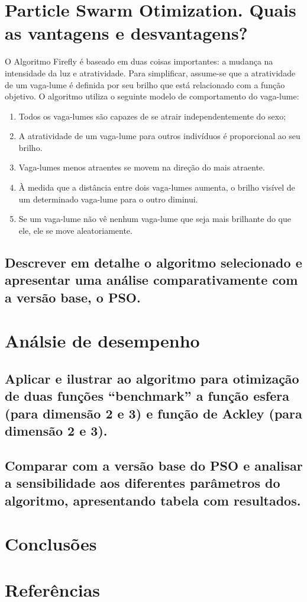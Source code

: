 \documentclass[10pt]{article}
\begin{document}
  \section{Particle Swarm Otimization. Quais as vantagens e desvantagens?}\label{sec:sworm}
  O Algoritmo Firefly é baseado em duas coisas importantes: a mudança na intensidade da luz e atratividade. Para simplificar, 
  assume-se que a atratividade de um vaga-lume é definida por seu brilho que está relacionado com a função objetivo.
  O algoritmo utiliza o seguinte modelo de comportamento do vaga-lume: 
\begin{enumerate}
  \item Todos os vaga-lumes são capazes de se atrair independentemente do sexo; 
  \item A atratividade de um vaga-lume para outros indivíduos é proporcional ao seu brilho. 
  \item Vaga-lumes menos atraentes se movem na direção do mais atraente. 
  \item À medida que a distância entre dois vaga-lumes aumenta, o brilho visível de um determinado vaga-lume para o outro diminui. 
  \item Se um vaga-lume não vê nenhum vaga-lume que seja mais brilhante do que ele, ele se move aleatoriamente. 
\end{enumerate}

\subsection{Descrever em detalhe o algoritmo selecionado e apresentar uma análise comparativamente com a versão base, o PSO.}\label{sec:desc-algo}

\section{Análsie de desempenho}\label{sec:an-desem}
\subsection{Aplicar e ilustrar ao algoritmo para otimização de duas funções “benchmark” a função esfera (para dimensão 2 e 3) e função de Ackley (para dimensão 2 e 3).}\label{sec:apre-da-org}
\subsection{Comparar com a versão base do PSO e analisar a sensibilidade aos diferentes parâmetros do algoritmo, apresentando tabela com resultados.}\label{sec:apre-da-org}

\section{Conclusões}\label{sec:conc}

\vspace{1cm}

\section{Referências}\label{sec:sup-inf-utl}






\pagebreak
\end{document}
